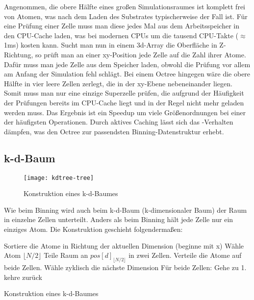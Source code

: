 Angenommen, die obere Hälfte eines großen Simulationsraumes ist komplett frei von Atomen, was nach dem Laden des Substrates typischerweise der Fall ist.
Für eine Prüfung einer Zelle muss man diese jedes Mal aus dem Arbeitsspeicher in den CPU-Cache laden, was bei modernen CPUs um die tausend CPU-Takte ($\approx$1ms) kosten kann.
Sucht man nun in einem 3d-Array die Oberfläche in Z-Richtung, so prüft man an einer xy-Position jede Zelle auf die Zahl ihrer Atome.
Dafür muss man jede Zelle aus dem Speicher laden, obwohl die Prüfung vor allem am Anfang der Simulation fehl schlägt.
Bei einem Octree hingegen wäre die obere Hälfte in vier leere Zellen zerlegt, die in der xy-Ebene nebeneinander liegen.
Somit muss man nur eine einzige Superzelle prüfen, die aufgrund der Häufigkeit der Prüfungen bereits im CPU-Cache liegt und in der Regel nicht mehr geladen werden muss.
Das Ergebnis ist ein Speedup um viele Größenordnungen bei einer der häufigsten Operationen.
Durch aktives Caching lässt sich das -Verhalten dämpfen, was den Octree zur passendsten Binning-Datenstruktur erhebt.

\subsection{k-d-Baum}

\begin{figure}[bthp]
  \texttt{[image: kdtree-tree]}
  \caption[Konstruktion eines k-d-Baumes]{Konstruktion eines k-d-Baumes}
  \label{fig:kdtree}
\end{figure}

Wie beim Binning wird auch beim k-d-Baum (k-dimensionaler Baum) der Raum in einzelne Zellen unterteilt.
Anders als beim Binning hält jede Zelle nur ein einziges Atom.
Die Konstruktion geschieht folgendermaßen:
\begin{algorithm}
  \begin{algorithmic}
    \STATE Sortiere die Atome in Richtung der aktuellen Dimension (beginne mit x)
    \STATE Wähle Atom $\lfloor N/2 \rfloor$
    \STATE Teile Raum an $pos[d]_{\lfloor N/2 \rfloor}$ in zwei Zellen. Verteile die Atome auf beide Zellen.
    \STATE Wähle zyklisch die nächste Dimension
    \STATE Für beide Zellen: Gehe zu 1.
    \STATE kehre zurück
    \ENDIF
  \end{algorithmic}
  \caption[Konstruktion eines k-d-Baumes]{Konstruktion eines k-d-Baumes}
  \label{algo:kdtree-construction}
\end{algorithm}

